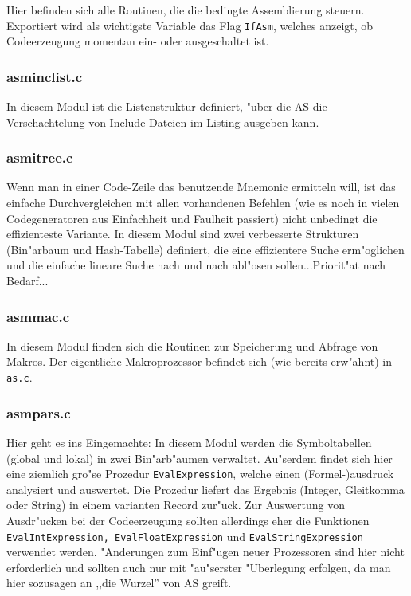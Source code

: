 \documentclass[12pt,a4paper,twoside]{report}
\newcommand{\tty}[1]{{\tt #1}}
\begin{document}
Hier befinden sich alle Routinen, die die bedingte Assemblierung steuern.
Exportiert wird als wichtigste Variable das Flag \tty{IfAsm}, welches
anzeigt, ob Codeerzeugung momentan ein- oder ausgeschaltet ist.

\subsubsection{asminclist.c}

In diesem Modul ist die Listenstruktur definiert, "uber die AS die
Verschachtelung von Include-Dateien im Listing ausgeben kann.

\subsubsection{asmitree.c}

Wenn man in einer Code-Zeile das benutzende Mnemonic ermitteln will, ist
das einfache Durchvergleichen mit allen vorhandenen Befehlen (wie es noch
in vielen Codegeneratoren aus Einfachheit und Faulheit passiert) nicht
unbedingt die effizienteste Variante.  In diesem Modul sind zwei
verbesserte Strukturen (Bin"arbaum und Hash-Tabelle) definiert, die eine
effizientere Suche erm"oglichen und die einfache lineare Suche nach und
nach abl"osen sollen...Priorit"at nach Bedarf...

\subsubsection{asmmac.c}

In diesem Modul finden sich die Routinen zur Speicherung und Abfrage von
Makros.  Der eigentliche Makroprozessor befindet sich (wie bereits
erw"ahnt) in {\tt as.c}.

\subsubsection{asmpars.c}

Hier geht es ins Eingemachte: In diesem Modul werden die Symboltabellen
(global und lokal) in zwei Bin"arb"aumen verwaltet.  Au"serdem findet sich
hier eine ziemlich gro"se Prozedur \tty{EvalExpression}, welche einen
(Formel-)ausdruck analysiert und auswertet.  Die Prozedur liefert das
Ergebnis (Integer, Gleitkomma oder String) in einem varianten Record zur"uck.
Zur Auswertung von Ausdr"ucken bei der Codeerzeugung sollten allerdings eher
die Funktionen \tty{EvalIntExpression, EvalFloatExpression} und
\tty{EvalStringExpression} verwendet werden.  "Anderungen zum Einf"ugen neuer
Prozessoren sind hier nicht erforderlich und sollten auch nur mit "au"serster
"Uberlegung erfolgen, da man hier sozusagen an ,,die Wurzel'' von AS greift.
\end{document}
